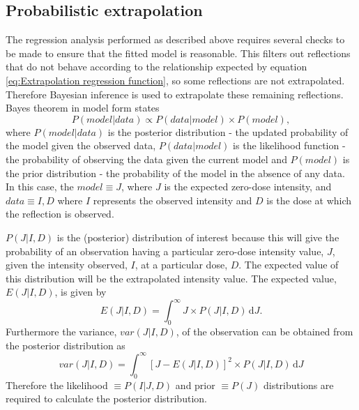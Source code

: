 \subsection{Probabilistic extrapolation}
\label{sub:Probabilistic extrapolation}
The regression analysis performed as described above requires several checks to be made to ensure that the fitted model is reasonable.
This filters out reflections that do not behave according to the relationship expected by equation \ref{eq:Extrapolation regression function}, so some reflections are not extrapolated.
Therefore Bayesian inference is used to extrapolate these remaining reflections.
Bayes theorem in model form states
\begin{equation}
P(model|data) \propto P(data | model) \times P(model),
\label{eq:Bayesian Theorem in model form}
\end{equation}
where $P(model|data)$ is the posterior distribution - the updated probability of the model given the observed data, $P(data|model)$ is the likelihood function - the probability of observing the data given the current model and $P(model)$ is the prior distribution - the probability of the model in the absence of any data.
In this case, the $model \equiv J$, where $J$ is the expected zero-dose intensity, and $data \equiv I, D$ where $I$ represents the observed intensity and $D$ is the dose at which the reflection is observed.

$P(J|I,D)$ is the (posterior) distribution of interest because this will give the probability of an observation having a particular zero-dose intensity value, $J$, given the intensity observed, $I$, at a particular dose, $D$.
The expected value of this distribution will be the extrapolated intensity value.
The expected value, $E(J|I, D)$, is given by
\begin{equation}
    E(J|I, D) = \int_0^{\infty} J \times P(J|I,D)\, \mathrm{d}J.
    \label{eq:Expected intensity value - Extrapolation method}
\end{equation}
Furthermore the variance, $var(J|I, D)$, of the observation can be obtained from the posterior distribution as
\begin{equation}
    var(J|I, D) = \int_0^{\infty}  \left[ J - E(J|I, D) \right]^2 \times P(J|I,D)\, \mathrm{d}J
    \label{eq:Variance of intensity value - Extrapolation method}
\end{equation}
Therefore the likelihood $\equiv P(I | J, D)$ and prior $\equiv P(J)$ distributions are required to calculate the posterior distribution.

